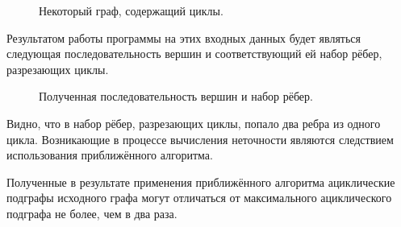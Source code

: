 \documentclass[spec, och, otchet, hidelinks]{SCWorks}
\begin{document}
\begin{figure}[h]
	\caption{Некоторый граф, содержащий циклы.}
\end{figure}

Результатом работы программы на этих входных данных будет являться следующая последовательность вершин и соответствующий ей набор рёбер, разрезающих циклы.

\begin{figure}[h!]
	\caption{Полученная последовательность вершин и набор рёбер.}
\end{figure}

Видно, что в набор рёбер, разрезающих циклы, попало два ребра из одного цикла.  Возникающие в процессе вычисления неточности являются следствием 
использования приближённого алгоритма.

\par Полученные в результате применения приближённого алгоритма ациклические подграфы исходного графа могут отличаться от максимального ациклического
подграфа не более, чем в два раза.
\end{document}
